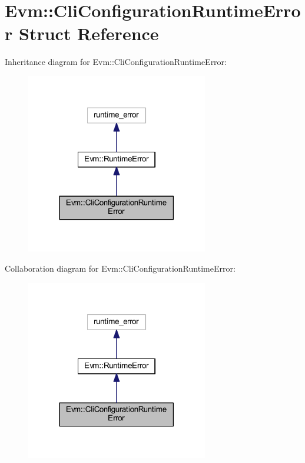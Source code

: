 \hypertarget{struct_evm_1_1_cli_configuration_runtime_error}{}\section{Evm\+:\+:Cli\+Configuration\+Runtime\+Error Struct Reference}
\label{struct_evm_1_1_cli_configuration_runtime_error}


Inheritance diagram for Evm\+:\+:Cli\+Configuration\+Runtime\+Error\+:
\nopagebreak
\begin{figure}[H]
\begin{center}
\leavevmode
\includegraphics[width=225pt]{struct_evm_1_1_cli_configuration_runtime_error__inherit__graph}
\end{center}
\end{figure}


Collaboration diagram for Evm\+:\+:Cli\+Configuration\+Runtime\+Error\+:
\nopagebreak
\begin{figure}[H]
\begin{center}
\leavevmode
\includegraphics[width=225pt]{struct_evm_1_1_cli_configuration_runtime_error__coll__graph}
\end{center}
\end{figure}
